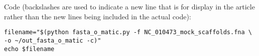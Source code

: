 Code (backslashes are used to indicate a new line that is for display in the article rather than the new lines being included in the actual code):

\begin{verbatim}
filename="$(python fasta_o_matic.py -f NC_010473_mock_scaffolds.fna \
-o ~/out_fasta_o_matic -c)"
echo $filename
\end{verbatim}
  
  
  
  
  
  
  
  
  
  
  